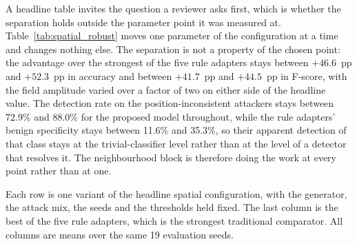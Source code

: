 \documentclass[notspecified,article,submit,moreauthors]{Definitions/mdpi}
\begin{document}
A headline table invites the question a reviewer asks first, which is whether the separation holds outside the parameter point it was measured at. Table~\ref{tab:spatial_robust} moves one parameter of the configuration at a time and changes nothing else. The separation is not a property of the chosen point: the advantage over the strongest of the five rule adapters stays between $+46.6$~pp and $+52.3$~pp in accuracy and between $+41.7$~pp and $+44.5$~pp in F-score, with the field amplitude varied over a factor of two on either side of the headline value. The detection rate on the position-inconsistent attackers stays between 72.9\% and 88.0\% for the proposed model throughout, while the rule adapters' benign specificity stays between 11.6\% and 35.3\%, so their apparent detection of that class stays at the trivial-classifier level rather than at the level of a detector that resolves it. The neighbourhood block is therefore doing the work at every point rather than at one.\begin{table}[!htbp]
  \centering
  \caption{Robustness of the spatial separation. Each row changes exactly one parameter of the headline spatial configuration and leaves the generator, the attack mix, the seeds and the thresholds alone, so a difference is attributable to that parameter.}
  \label{tab:spatial_robust}
  \footnotesize
  \setlength{\tabcolsep}{4pt}
  \renewcommand{\arraystretch}{1.15}
\par
\vspace{2pt}
\raggedright\scriptsize
Each row is one variant of the headline spatial configuration, with the generator, the attack mix, the seeds and the thresholds held fixed. The last column is the best of the five rule adapters, which is the strongest traditional comparator. All columns are means over the same 19 evaluation seeds.
\end{table}
\end{document}
